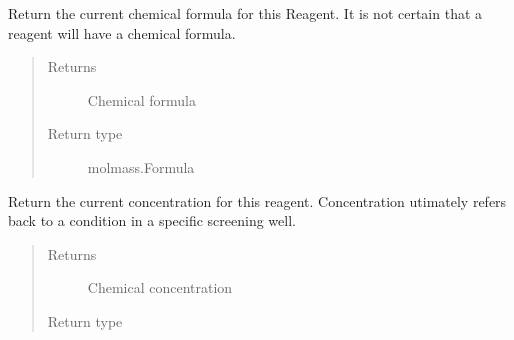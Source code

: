 \documentclass[letterpaper,10pt,english]{sphinxmanual}
\begin{document}
\begin{fulllineitems}
\begin{quote}
\begin{description}
\begin{itemize}
\end{itemize}

\end{description}\end{quote}

\begin{fulllineitems}
\label{\detokenize{polo.crystallography:polo.crystallography.cocktail.Reagent.chemical_formula}}
Return the current chemical formula for this Reagent. It is not
certain that a reagent will have a chemical formula.
\begin{quote}\begin{description}
\item[{Returns}] \leavevmode
Chemical formula

\item[{Return type}] \leavevmode
molmass.Formula

\end{description}\end{quote}

\end{fulllineitems}


\begin{fulllineitems}
\label{\detokenize{polo.crystallography:polo.crystallography.cocktail.Reagent.concentration}}
Return the current concentration for this reagent. Concentration
utimately refers back to a condition in a specific screening well.
\begin{quote}\begin{description}
\item[{Returns}] \leavevmode
Chemical concentration

\item[{Return type}] \leavevmode
{\hyperref[\detokenize{polo.crystallography:polo.crystallography.cocktail.SignedValue}]{}}

\end{description}\end{quote}


\end{fulllineitems}
\end{fulllineitems}
\end{document}
